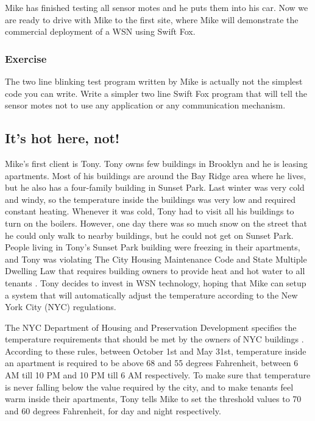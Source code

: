 \documentclass[11pt]{article}
\begin{document}
Mike has finished testing all sensor motes and he puts them into his car.
Now we are ready to drive with Mike to the first site, where Mike will
demonstrate the commercial deployment of a WSN using Swift Fox. 

\vspace{\fill}

\subsubsection{Exercise}

The two line blinking test program written by Mike is actually not 
the simplest code you can write. Write a simpler two line Swift Fox 
program that will tell the sensor motes not to use any application 
or any communication mechanism.


\subsection{It's hot here, not!}

Mike's first client is Tony. Tony owns few buildings in Brooklyn and he is 
leasing apartments. Most of his buildings are around the Bay Ridge area
where he lives, but he also has a four-family building in Sunset Park. Last
winter was very cold and windy, so the temperature inside the buildings was
very low and required constant heating. Whenever it was cold, Tony had to
visit all his buildings to turn on the boilers. However, one day there was 
so much snow on the street that he could only walk to nearby buildings, but
he could not get on Sunset Park. People living in Tony's Sunset Park
building were freezing in their apartments, and Tony was violating The City
Housing Maintenance Code and State Multiple Dwelling Law that requires
building owners to provide heat and hot water to all tenants
\cite{nyc-dhpd:online}. Tony decides to invest in WSN technology, hoping
that Mike can setup a system that will automatically adjust the temperature
according to the New York City (NYC) regulations.

The NYC Department of Housing and Preservation Development specifies the
temperature requirements that should be met by the owners of NYC buildings 
\cite{nyc-dhpd:online}. According to these rules, between October 1st and
May 31st, temperature inside an apartment is required to be above 68 and 55
degrees Fahrenheit, between 6 AM till 10 PM and 10 PM till 6 AM
respectively. To make sure that temperature is never falling below the
value required by the city, and to make tenants feel warm inside their
apartments, Tony tells Mike to set the threshold values to 70 and 60
degrees Fahrenheit, for day and night respectively.
\end{document}
